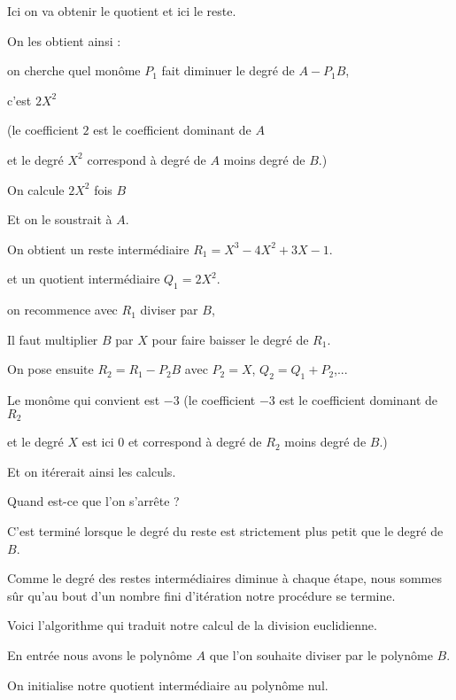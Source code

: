 Ici on va obtenir le quotient et ici le reste.

\change

On les obtient ainsi : 

on cherche quel monôme $P_1$ fait diminuer le degré de $A-P_1B$, 

c'est $2X^2$ 

  (le coefficient $2$ est le coefficient dominant de $A$
  
  et le degré $X^2$ correspond à degré de $A$ moins degré de $B$.)
  
  
  On calcule $2X^2$ fois $B$
  
\change


Et on le soustrait à $A$.

On obtient un reste intermédiaire $R_1=X^3-4X^2+3X-1$.

et un quotient intermédiaire $Q_1 = 2X^2$.

\change

 on recommence avec $R_1$ diviser par $B$,
 
 Il faut multiplier $B$ par $X$ pour faire baisser le degré de $R_1$.
 

  
 
\change

  On pose ensuite  $R_2 = R_1-P_2B$ avec $P_2 = X$, $Q_2= Q_1+P_2$,... 
  
  
  Le monôme qui convient est $-3$
  (le coefficient $-3$ est le coefficient dominant de $R_2$
  
  et le degré $X$ est ici $0$ et correspond à degré de $R_2$ moins degré de $B$.) 
  
  
  Et on itérerait ainsi les calculs.
  
\change

Quand est-ce que l'on s'arrête ?

C'est terminé lorsque le degré du reste est strictement plus petit que le degré de $B$.

Comme le degré des restes intermédiaires diminue à chaque étape, nous sommes sûr 
qu'au bout d'un nombre fini d'itération  notre procédure se termine.


\diapo

Voici l'algorithme qui traduit notre calcul de la division euclidienne.

En entrée nous avons le polynôme $A$ que l'on souhaite diviser par le polynôme $B$.

On initialise notre quotient intermédiaire au polynôme nul.

